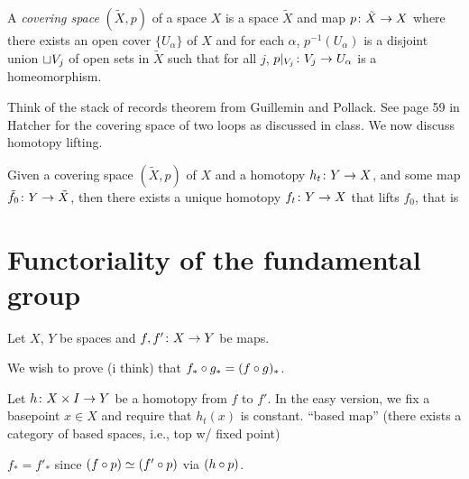 \documentclass[11pt,leqno,oneside]{amsart}
\newenvironment{dateenv}{
  \vspace{1em}
}{
  \vspace{1em}
}
\newcommand{\mydate}[4]{
  \newdate{#1}{#2}{#3}{#4}
  \begin{dateenv}
    \hfill\displaydate{#1}
  \end{dateenv}
}
\numberwithin{thm}{section}
\newcommand{\homotopic}{\simeq}
\newcommand{\x}{\times}
\begin{document}
\begin{defn}
  A \emph{covering space} \((\tilde{X},p)\) of a space \(X\) is a space \(\tilde{X}\)
  and map \(p \colon \tilde{X} \to X\) where there exists an open cover
  \(\{U_\alpha\}\) of \(X\) and for each $\alpha$, \(p^{-1}(U_\alpha)\) is a
  disjoint union $\sqcup V_j$ of open sets in \(\tilde{X}\) such that for all $j$, $p|_{V_j} \colon V_j \to U_\alpha$ is a homeomorphism.
\end{defn}

Think of the stack of records theorem from Guillemin and Pollack. See
page 59 in Hatcher for the covering space of two loops as discussed in
class. We now discuss homotopy lifting.

\begin{prop}
  Given a covering space \((\tilde{X},p)\) of \(X\) and a homotopy
  \(h_t \colon Y \to X\), and some map
  \(\tilde{f}_0 \colon Y \to \tilde{X}\), then there exists a unique
  homotopy \(f_t \colon Y \to X\) that lifts \(f_0\), that is
  \begin{center}
  \end{center}
\end{prop}

\mydate{d4}{30}{1}{2017}

\section{Functoriality of the fundamental group}

Let $X$, $Y$ be spaces and $f,f' \colon X \to Y$ be maps.

We wish to prove (i think) that $f_* \circ g_* = (f \circ g)_*$.

Let $h\from X \x I \to Y$ be a homotopy from $f$ to $f'$.  In the easy version, we fix a basepoint $x \in X$ and require that $h_t(x)$ is constant. ``based map'' (there exists a category of based spaces, i.e., top w/ fixed point)

$f_* = f'_*$ since $(f \of p) \homotopic (f' \of p)$ via $(h \circ p)$.
\end{document}
